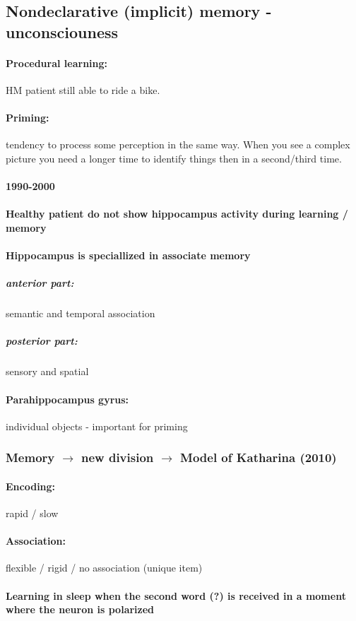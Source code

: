 \documentclass[12pt,article,oneside,a4paper]{memoir}
\begin{document}
\subsection{Nondeclarative (implicit) memory - unconsciouness}
\paragraph{Procedural learning:} HM patient still able to ride a bike.
\paragraph{Priming:} tendency to process some perception in the same way. When you see a complex picture you need a longer time to identify things then in a second/third time.

\paragraph{1990-2000}
\paragraph{Healthy patient do not show hippocampus activity during learning / memory}
\paragraph{Hippocampus is speciallized in associate memory}
\subparagraph{anterior part:} semantic and temporal association
\subparagraph{posterior part:} sensory and spatial
\paragraph{Parahippocampus gyrus:} individual objects - important for priming

\subsubsection{Memory $\rightarrow$ new division $\rightarrow$ Model of Katharina (2010)}
\paragraph{Encoding:} rapid / slow
\paragraph{Association:} flexible / rigid / no association (unique item)
\paragraph{Learning in sleep when the second word (?) is received in a moment where the neuron is polarized}
\end{document}

